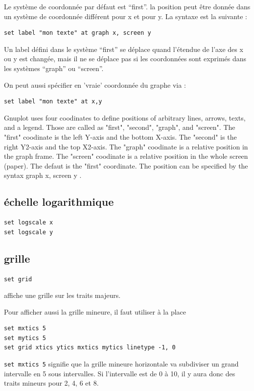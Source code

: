 \documentclass[a4paper,twoside]{article}
\begin{document}
Le système de coordonnée par défaut est ``first''. la position peut être donnée dans un système de coordonnée différent pour x et pour y. La syntaxe est la suivante : 
\begin{verbatim}
set label "mon texte" at graph x, screen y
\end{verbatim}

\begin{remarque}
Un label défini dans le système ``first'' se déplace quand l'étendue de l'axe des x ou y est changée, mais il ne se déplace pas si les coordonnées sont exprimés dans les systèmes ``graph'' ou ``screen''.
\end{remarque}

On peut aussi spécifier en 'vraie' coordonnée du graphe via :
\begin{verbatim}
set label "mon texte" at x,y
\end{verbatim}




Gnuplot uses four coodinates to define positions of arbitrary lines, arrows, texts, and a legend. Those are called as "first", "second", "graph", and "screen". The "first" coodinate is the left Y-axis and the bottom X-axis. The "second" is the right Y2-axis and the top X2-axis. The "graph" coodinate is a relative position in the graph frame. The "screen" coodinate is a relative position in the whole screen (paper). The defaut is the "first" coordinate. The position can be specified by the syntax graph x, screen y .

\subsection{échelle logarithmique}
\begin{verbatim}
set logscale x
set logscale y
\end{verbatim}

\subsection{grille}
\begin{verbatim}
set grid
\end{verbatim}
affiche une grille sur les traits majeurs.

Pour afficher aussi la grille mineure, il faut utiliser à la place 
\begin{verbatim}
set mxtics 5
set mytics 5
set grid xtics ytics mxtics mytics linetype -1, 0
\end{verbatim}
\texttt{set mxtics 5} signifie que la grille mineure horizontale va subdiviser un grand intervalle en 5 sous intervalles. Si l'intervalle est de 0 à 10, il y aura donc des traits mineurs pour 2, 4, 6 et 8. 
\end{document}
